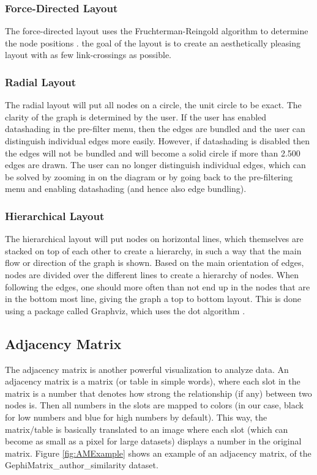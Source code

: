 \documentclass[journal]{vgtc}                %
\begin{document}
\subsubsection{Force-Directed Layout}
The force-directed layout uses the Fruchterman-Reingold algorithm to determine the node positions \cite{Fruchterman:1991}. the goal of the layout is to create an aesthetically pleasing layout with as few link-crossings as possible.

\subsubsection{Radial Layout}
The radial layout will put all nodes on a circle, the unit circle to be exact. The clarity of the graph is determined by the user. If the user has enabled datashading in the pre-filter menu, then the edges are bundled and the user can distinguish individual edges more easily. However, if datashading is disabled then the edges will not be bundled and will become a solid circle if more than 2.500 edges are drawn. The user can no longer distinguish individual edges, which can be solved by zooming in on the diagram or by going back to the pre-filtering menu and enabling datashading (and hence also edge bundling).

\subsubsection{Hierarchical Layout}
The hierarchical layout will put nodes on horizontal lines, which themselves are stacked on top of each other to create a hierarchy, in such a way that the main flow or direction of the graph is shown. Based on the main orientation of edges, nodes are divided over the different lines to create a hierarchy of nodes. When following the edges, one should more often than not end up in the nodes that are in the bottom most line, 
giving the graph a top to bottom layout. This is done using a package called Graphviz, which uses the dot algorithm \cite{Gansner:1993}.

\subsection{Adjacency Matrix} \label{sect:AM} %
The adjacency matrix is another powerful visualization to analyze data. An adjacency matrix is a matrix (or table in simple words), where each slot in the matrix is a number that denotes how strong the relationship (if any) between two nodes is. Then all numbers in the slots are mapped to colors (in our case, black for low numbers and blue for high numbers by default). This way, the matrix/table is basically translated to an image where each slot (which can become as small as a pixel for large datasets) displays a number in the original matrix. Figure \ref{fig:AMExample} shows an example of an adjacency matrix, of the GephiMatrix\_author\_similarity dataset.
\end{document}
